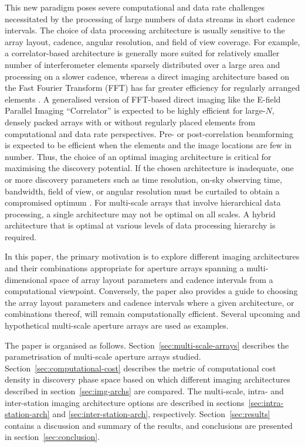 \documentclass[
  journal=pasa,
  manuscript=article-type,
  year=2020,
  volume=37,
]{cup-journal}
\begin{document}
This new paradigm poses severe computational and data rate challenges necessitated by the processing of large numbers of data streams in short cadence intervals. The choice of data processing architecture is usually sensitive to the array layout, cadence, angular resolution, and field of view coverage. For example, a correlator-based architecture is generally more suited for relatively smaller number of interferometer elements sparsely distributed over a large area and processing on a slower cadence, whereas a direct imaging architecture based on the Fast Fourier Transform (FFT) has far greater efficiency for regularly arranged elements \citep{Daishido+1991,Otobe+1994,Tegmark+2009,Tegmark+2010,Foster+2014,Masui+2019}. A generalised version of FFT-based direct imaging like the E-field Parallel Imaging ``Correlator'' \citep[EPIC;][]{Thyagarajan+2017,Thyagarajan+2019,Krishnan+2023} is expected to be highly efficient for large-$N$, densely packed arrays with or without regularly placed elements from computational and data rate perspectives. Pre- or post-correlation beamforming is expected to be efficient when the elements and the image locations are few in number. Thus, the choice of an optimal imaging architecture is critical for maximising the discovery potential. If the chosen architecture is inadequate, one or more discovery parameters such as time resolution, on-sky observing time, bandwidth, field of view, or angular resolution must be curtailed to obtain a compromised optimum \citep[for example,][]{Price2024}. For multi-scale arrays that involve hierarchical data processing, a single architecture may not be optimal on all scales. A hybrid architecture that is optimal at various levels of data processing hierarchy is required. 

In this paper, the primary motivation is to explore different imaging architectures and their combinations appropriate for aperture arrays spanning a multi-dimensional space of array layout parameters and cadence intervals from a computational viewpoint. Conversely, the paper also provides a guide to choosing the array layout parameters and cadence intervals where a given architecture, or combinations thereof, will remain computationally efficient. Several upcoming and hypothetical multi-scale aperture arrays are used as examples. 

The paper is organised as follows.
Section~\ref{sec:multi-scale-arrays} describes the parametrisation of multi-scale aperture arrays studied. Section~\ref{sec:computational-cost} describes the metric of computational cost density in discovery phase space based on which different imaging architectures described in section~\ref{sec:img-archs} are compared. The multi-scale, intra- and inter-station imaging architecture options are described in sections~\ref{sec:intra-station-arch} and \ref{sec:inter-station-arch}, respectively. Section~\ref{sec:results} contains a discussion and summary of the results, and conclusions are presented in section~\ref{sec:conclusion}. 
\end{document}
